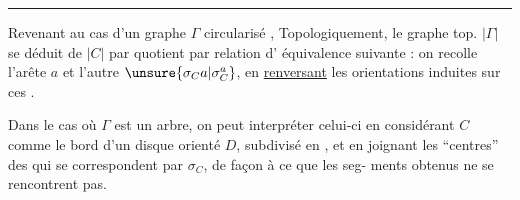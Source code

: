 \par\noindent\rule{\linewidth}{.4pt}

Revenant au cas d'un graphe $\Gamma$ circularisé ,
Topologiquement, le graphe top. $|\Gamma|$
se déduit de $|C|$ par 
 quotient par  relation d'%
équivalence suivante : on recolle
l'arête $a$ et l'autre $\unsure{\sigma_C a|\sigma_C^a}$, en \uline{renversant} les
orientations induites sur ces .

Dans le cas où $\Gamma$ est un
arbre, on peut interpréter
celui-ci  en considérant
$C$ comme le bord
d'un disque orienté $D$,
subdivisé en , et
en joignant les ``centres''
des  qui se correspondent
par $\sigma_C$, de façon à ce que les seg-\linebreak
ments obtenus ne se rencontrent pas.

